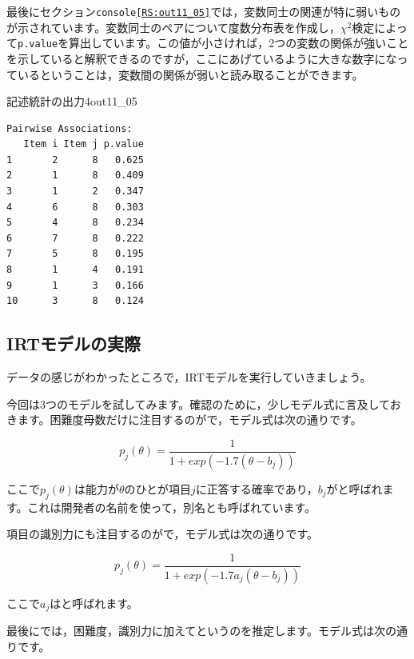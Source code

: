 \documentclass{ltjsbook}
\begin{document}
最後にセクション\texttt{console\ref{RS:out11_05}}では，変数同士の関連が特に弱いものが示されています。変数同士のペアについて度数分布表を作成し，$\chi^2$検定によって\texttt{p.value}を算出しています。この値が小さければ，2つの変数の関係が強いことを示していると解釈できるのですが，ここにあげているように大きな数字になっているということは，変数間の関係が弱いと読み取ることができます。
\begin{Rscreen}{記述統計の出力4}{out11_05}
    \begin{verbatim}
Pairwise Associations:
   Item i Item j p.value
1       2      8   0.625
2       1      8   0.409
3       1      2   0.347
4       6      8   0.303
5       4      8   0.234
6       7      8   0.222
7       5      8   0.195
8       1      4   0.191
9       1      3   0.166
10      3      8   0.124
    \end{verbatim}
    \end{Rscreen}
\subsection{IRTモデルの実際}
データの感じがわかったところで，IRTモデルを実行していきましょう。

今回は3つのモデルを試してみます。確認のために，少しモデル式に言及しておきます。困難度母数だけに注目するのがで，モデル式は次の通りです。

\[ p_j(\theta) = \frac{1}{1+exp(-1.7 (\theta -b_j))} \]

ここで$p_j(\theta)$は能力が$\theta$のひとが項目$j$に正答する確率であり，$b_j$がと呼ばれます。これは開発者の名前を使って，別名とも呼ばれています。

項目の識別力にも注目するのがで，モデル式は次の通りです。

\[ p_j(\theta) = \frac{1}{1+exp(-1.7 a_j(\theta -b_j))} \]

ここで$a_j$はと呼ばれます。

最後にでは，困難度，識別力に加えてというのを推定します。モデル式は次の通りです。
\end{document}
